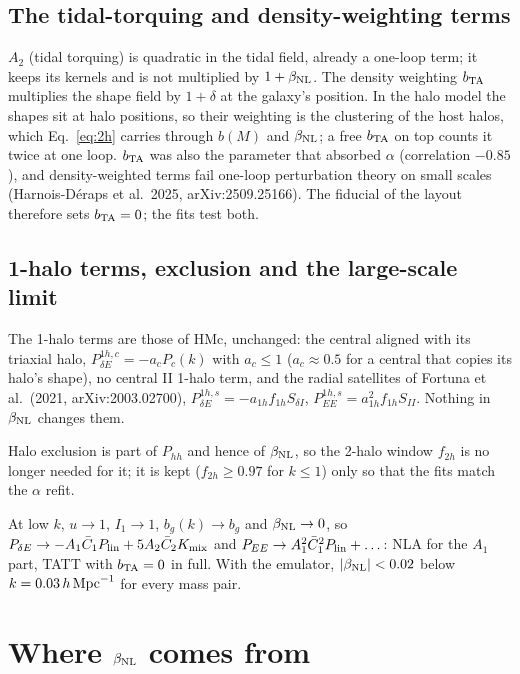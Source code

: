 \documentclass[11pt]{article}
\newcommand{\hMpc}{\,h\,{\rm Mpc}^{-1}}
\newcommand{\Plin}{P_{\rm lin}}
\newcommand{\bTA}{b_{\rm TA}}
\newcommand{\bNL}{\beta_{\rm NL}}
\newcommand{\Cb}{\bar C_1}
\newcommand{\Cbb}{\bar C_2}
\begin{document}
\subsection{The tidal-torquing and density-weighting terms}
\label{sec:tatt}

$A_2$ (tidal torquing) is quadratic in the tidal field, already a one-loop
term; it keeps its kernels and is not multiplied by $1 + \bNL$. The density
weighting $\bTA$ multiplies the shape field by $1 + \delta$ at the galaxy's
position. In the halo model the shapes sit at halo positions, so their
weighting is the clustering of the host halos, which Eq.~\eqref{eq:2h}
carries through $b(M)$ and $\bNL$; a free $\bTA$ on top counts it twice at one
loop. $\bTA$ was also the parameter that absorbed $\alpha$ (correlation
$-0.85$), and density-weighted terms fail one-loop perturbation theory on
small scales (Harnois-D\'eraps et al.\ 2025, arXiv:2509.25166). The fiducial
of the layout therefore sets $\bTA = 0$; the fits test both.

\subsection{1-halo terms, exclusion and the large-scale limit}

The 1-halo terms are those of HMc, unchanged: the central aligned with its
triaxial halo, $P^{1h,c}_{\delta E} = -a_cP_c(k)$ with $a_c \le 1$
($a_c \approx 0.5$ for a central that copies its halo's shape), no central II
1-halo term, and the radial satellites of Fortuna et al.\ (2021,
arXiv:2003.02700), $P^{1h,s}_{\delta E} = -a_{1h}f_{1h}S_{\delta I}$,
$P^{1h,s}_{EE} = a_{1h}^2f_{1h}S_{II}$. Nothing in $\bNL$ changes them.

Halo exclusion is part of $P_{hh}$ and hence of $\bNL$, so the 2-halo window
$f_{2h}$ is no longer needed for it; it is kept ($f_{2h} \ge 0.97$ for
$k \le 1$) only so that the fits match the $\alpha$ refit.

At low $k$, $u \to 1$, $I_1 \to 1$, $b_g(k) \to b_g$ and $\bNL \to 0$, so
$P_{\delta E} \to -A_1\Cb\Plin + 5A_2\Cbb K_{\rm mix}$ and
$P_{EE} \to A_1^2\Cb^2\Plin + \dots$: NLA for the $A_1$ part, TATT with
$\bTA = 0$ in full. With the emulator, $|\bNL| < 0.02$ below
$k = 0.03\hMpc$ for every mass pair.

\section{Where \texorpdfstring{$\bNL$}{beta\_NL} comes from}
\label{sec:source}
\end{document}
